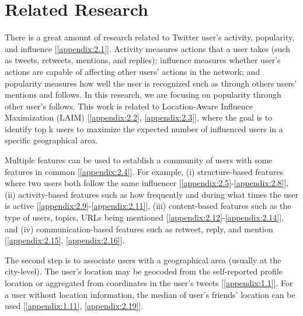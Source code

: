 \section{Related Research}

There is a great amount of research related to Twitter user's activity, popularity, and influence [\ref{appendix:2.1}]. Activity measures actions that a user takes (such as tweets, retweets, mentions, and replies); influence measures whether user's actions are capable of affecting other users' actions in the network; and popularity measures how well the user is recognized such as through others users' mentions and follows. In this research, we are focusing on popularity through other user's follows. This work is related to Location-Aware Influence Maximization (LAIM) [\ref{appendix:2.2}, \ref{appendix:2.3}], where the goal is to identify top k users to maximize the expected number of influenced users in a specific geographical area. 

Multiple features can be used to establish a community of users with some features in common [\ref{appendix:2.4}]. For example,  (i) structure-based features where two users both follow the same influencer [\ref{appendix:2.5}-\ref{appendix:2.8}], (ii) activity-based features such as how frequently and during what times the user is active [\ref{appendix:2.9}-\ref{appendix:2.11}], (iii) content-based features such as the type of users, topics, URLs being mentioned [\ref{appendix:2.12}-\ref{appendix:2.14}], and (iv) communication-based features such as retweet, reply, and mention [\ref{appendix:2.15}, \ref{appendix:2.16}]. 

The second step is to associate users with a geographical area (usually at the city-level). The user's location may be geocoded from the self-reported profile location or aggregated from coordinates in the user's tweets [\ref{appendix:1.1}]. For a user without location information, the median of user's friends' location can be used [\ref{appendix:1.11}, \ref{appendix:2.19}].%


